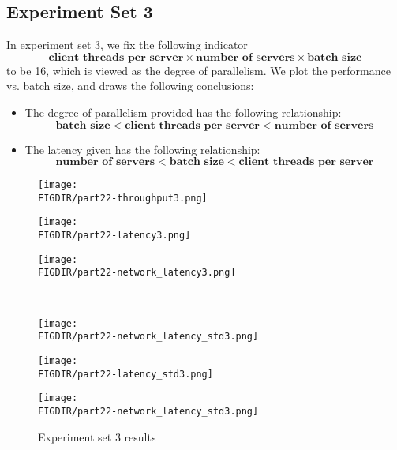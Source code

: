 \documentclass{article}
\begin{document}
\begin{spacing}{1.1}
\subsection{Experiment Set 3}
In experiment set 3, we fix the following indicator 
\[
\textbf{client threads per server} \times \textbf{number of servers} \times\textbf{batch size}
\]
to be 16, which is viewed as the degree of parallelism. We plot the performance vs. batch size, and draws the following conclusions:
\begin{itemize}
\setlength\itemsep{1pt}
    \item The degree of parallelism provided has the following relationship:
    \[
\textbf{batch size} < \textbf{client threads per server}< \textbf{number of servers} 
\]
\item The latency given has the following relationship:
    \[\textbf{number of servers}  <
\textbf{batch size} < \textbf{client threads per server}
\]
\end{itemize}

\begin{figure}[htbp]
    \centering
    \begin{minipage}{0.32\linewidth}
        \centering
	\texttt{[image: \\FIGDIR/part22-throughput3.png]}
	\label{throuput3}
    \end{minipage}
    \begin{minipage}{0.32\linewidth}
        \centering
        \texttt{[image: \\FIGDIR/part22-latency3.png]}
        \label{latency3}
    \end{minipage}
    \begin{minipage}{0.32\linewidth}
        \centering
        \texttt{[image: \\FIGDIR/part22-network\_latency3.png]}
        \label{network-latency3}
    \end{minipage} \\
    \begin{minipage}{0.32\linewidth}
        \centering
        \texttt{[image: \\FIGDIR/part22-network\_latency\_std3.png]}
        \label{queue-latency3}
    \end{minipage}
    \begin{minipage}{0.32\linewidth}
        \centering
        \texttt{[image: \\FIGDIR/part22-latency\_std3.png]}
        \label{latency-std3}
    \end{minipage}
    \begin{minipage}{0.32\linewidth}
        \centering
        \texttt{[image: \\FIGDIR/part22-network\_latency\_std3.png]}
        \label{networkk-latency-std3}
    \end{minipage}
    \caption{Experiment set 3 results}
\end{figure}



\end{spacing}
\end{document}
